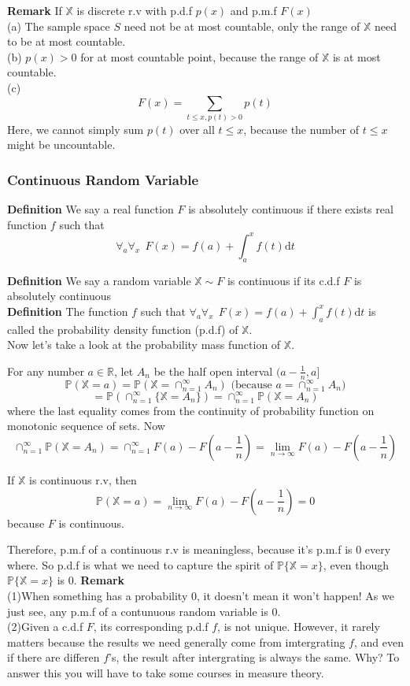 \documentclass[a4paper,12pt]{article}
\begin{document}
\textbf{Remark}
If $\mathbb{X}$ is discrete r.v with p.d.f $p(x)$ and p.m.f $F(x)$\\
(a) The sample space $S$ need not be at most countable, only the range of $\mathbb{X}$ need to be at most countable.\\
(b) $p(x) > 0$ for at most countable point, because the range of $\mathbb{X}$ is at most countable.\\
(c) $$F(x) = \sum_{t\leq x, p(t)>0}p(t)$$
Here, we cannot simply sum $p(t)$ over all $t\leq x$, because the number of $t\leq x$ might be uncountable.


\subsubsection{Continuous Random Variable}
\textbf{Definition} We say a real function $F$ is absolutely continuous if there exists real function $f$ such that
$$\forall_a \forall_x \ \ F(x) = f(a) + \int_a^x f(t) \mathrm{d}t$$

\textbf{Definition}
We say a random variable $\mathbb{X} \sim F$ is continuous if its c.d.f $F$ is absolutely continuous\\

\textbf{Definition}
The function $f$ such that $\forall_a \forall_x \ \ F(x) = f(a) + \int_a^x f(t) \mathrm{d}t$ is called the probability density function (p.d.f) of $\mathbb{X}$.\\

Now let's take a look at the probability mass function of $\mathbb{\mathbb{X}}$.

For any number $a\in\mathbb{R}$, let $A_n$ be the half open interval $(a-\frac{1}{n}, a]$
$$\mathbb{P}(\mathbb{X}=a) = \mathbb{P}( \mathbb{X} = \cap_{n=1}^\infty A_n )
 \text{\ \ \ (because   } a = \cap_{n=1}^\infty A_n )$$
$$= \mathbb{P}(\cap_{n=1}^\infty\{\mathbb{X} = A_n \}) = \cap_{n=1}^\infty\mathbb{P}(\mathbb{X} = A_n )$$ where the last equality comes from the continuity of probability function on monotonic sequence of sets. Now
$$\cap_{n=1}^\infty\mathbb{P}(\mathbb{X} = A_n ) = \cap_{n=1}^\infty F(a) - F(a-\frac{1}{n}) = \lim_{n\to\infty} F(a) - F(a-\frac{1}{n})$$

If $\mathbb{X}$ is continuous r.v,  then
$$\mathbb{P}(\mathbb{X}=a) = \lim_{n\to\infty} F(a) - F(a-\frac{1}{n}) = 0$$
because $F$ is continuous.

Therefore, p.m.f of a continuous r.v is meaningless, because it's p.m.f is 0 every where. So p.d.f is what we need to capture the spirit of $\mathbb{P}\{\mathbb{X}=x\}$, even though $\mathbb{P}\{\mathbb{X}=x\}$ is $0$.
\textbf{Remark}\\
(1)When something has a probability 0, it doesn't mean it won't happen! As we just see, any p.m.f of a contunuous random variable is 0.\\
(2)Given a c.d.f $F$, its corresponding p.d.f $f$, is not unique. However, it rarely matters because the results we need generally come from imtergrating $f$, and even if there are differen $f$'s, the result after intergrating is always the same. Why? To answer this you will have to take some courses in measure theory.
\end{document}

